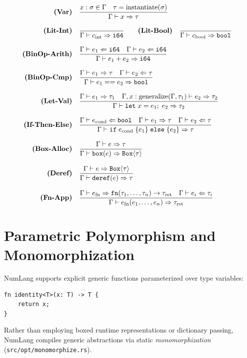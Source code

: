 \begin{align}
\text{\bf (Var)} \quad & \frac{x : \sigma \in \Gamma \quad \tau = \text{instantiate}(\sigma)}{\Gamma \vdash x \Rightarrow \tau} \\[0.8em]
\text{\bf (Lit-Int)} \quad & \frac{}{\Gamma \vdash c_{\text{int}} \Rightarrow \mathtt{i64}} \qquad
\text{\bf (Lit-Bool)} \quad \frac{}{\Gamma \vdash c_{\text{bool}} \Rightarrow \mathtt{bool}} \\[0.8em]
\text{\bf (BinOp-Arith)} \quad & \frac{\Gamma \vdash e_1 \Leftarrow \mathtt{i64} \quad \Gamma \vdash e_2 \Leftarrow \mathtt{i64}}{\Gamma \vdash e_1 + e_2 \Rightarrow \mathtt{i64}} \\[0.8em]
\text{\bf (BinOp-Cmp)} \quad & \frac{\Gamma \vdash e_1 \Rightarrow \tau \quad \Gamma \vdash e_2 \Leftarrow \tau}{\Gamma \vdash e_1 == e_2 \Rightarrow \mathtt{bool}} \\[0.8em]
\text{\bf (Let-Val)} \quad & \frac{\Gamma \vdash e_1 \Rightarrow \tau_1 \quad \Gamma, x : \text{generalize}(\Gamma, \tau_1) \vdash e_2 \Rightarrow \tau_2}{\Gamma \vdash \mathtt{let}\; x = e_1;\; e_2 \Rightarrow \tau_2} \\[0.8em]
\text{\bf (If-Then-Else)} \quad & \frac{\Gamma \vdash e_{\text{cond}} \Leftarrow \mathtt{bool} \quad \Gamma \vdash e_1 \Rightarrow \tau \quad \Gamma \vdash e_2 \Leftarrow \tau}{\Gamma \vdash \mathtt{if}\; e_{\text{cond}}\; \{ e_1 \}\; \mathtt{else}\; \{ e_2 \} \Rightarrow \tau} \\[0.8em]
\text{\bf (Box-Alloc)} \quad & \frac{\Gamma \vdash e \Rightarrow \tau}{\Gamma \vdash \mathtt{box}(e) \Rightarrow \mathtt{Box}\langle \tau \rangle} \\[0.8em]
\text{\bf (Deref)} \quad & \frac{\Gamma \vdash e \Rightarrow \mathtt{Box}\langle \tau \rangle}{\Gamma \vdash \mathtt{deref}(e) \Rightarrow \tau} \\[0.8em]
\text{\bf (Fn-App)} \quad & \frac{\Gamma \vdash e_{\text{fn}} \Rightarrow \mathtt{fn}(\tau_1, \dots, \tau_n) \to \tau_{\text{ret}} \quad \Gamma \vdash e_i \Leftarrow \tau_i}{\Gamma \vdash e_{\text{fn}}(e_1, \dots, e_n) \Rightarrow \tau_{\text{ret}}}
\end{align}

\section{Parametric Polymorphism and Monomorphization}
\label{sec:types:monomorphize}

NumLang supports explicit generic functions parameterized over type variables:
\begin{lstlisting}[language=NumLang]
fn identity<T>(x: T) -> T {
    return x;
}
\end{lstlisting}
Rather than employing boxed runtime representations or dictionary passing, NumLang compiles generic abstractions via static \emph{monomorphization} (\texttt{src/opt/monomorphize.rs}). 

